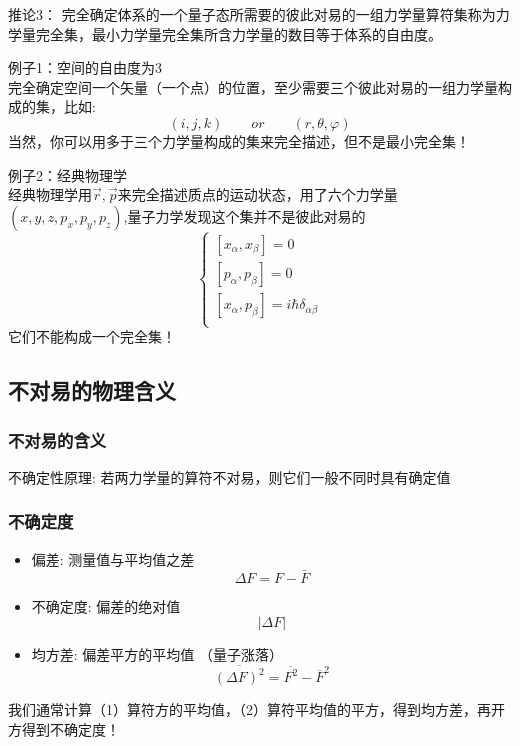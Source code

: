 \begin{frame} [allowframebreaks=]
    \begin{atcbox}{推论3：}
        完全确定体系的一个量子态所需要的彼此对易的一组力学量算符集称为力学量完全集，最小力学量完全集所含力学量的数目等于体系的自由度。
    \end{atcbox}
    \alert{例子1：空间的自由度为3} \\
    完全确定空间一个矢量（一个点）的位置，至少需要三个彼此对易的一组力学量构成的集，比如: $$(i,j,k) \qquad or \qquad (r,\theta,\varphi) $$
    当然，你可以用多于三个力学量构成的集来完全描述，但不是最小完全集！\\
\end{frame} 

\begin{frame}
    \alert{例子2：经典物理学} \\
    经典物理学用$\vec{r}, \vec{p}$来完全描述质点的运动状态，用了六个力学量$(x,y,z, p_x, p_y, p_z)$,量子力学发现这个集并不是彼此对易的
    $$\begin{cases}
        [x_\alpha,x_\beta]= 0  \\ 
        [p_\alpha,p_\beta]= 0  \\ 
        [x_\alpha,p_\beta]= i\hbar \delta_{\alpha\beta}  \\ 
    \end{cases}$$
    它们不能构成一个完全集！
\end{frame} 

\subsection{不对易的物理含义}

\begin{frame} 
    \frametitle{不对易的含义}
    \begin{atcbox}{不确定性原理:}
        若两力学量的算符不对易，则它们一般不同时具有确定值    
    \end{atcbox}
\end{frame} 

\begin{frame} 
    \frametitle{不确定度}
    \begin{itemize}
        \item 偏差: 测量值与平均值之差
        $$ \Delta F=F-\bar{F} $$
        \item 不确定度: 偏差的绝对值
         $$ \left | \Delta F  \right | $$
        \item 均方差: 偏差平方的平均值 （量子涨落）
        $$ \overline{(\Delta F)^2} = \overline{F^2} - \overline{F}^2$$
    \end{itemize}   
    我们通常计算（1）算符方的平均值，（2）算符平均值的平方，得到均方差，再开方得到不确定度！
\end{frame} 

